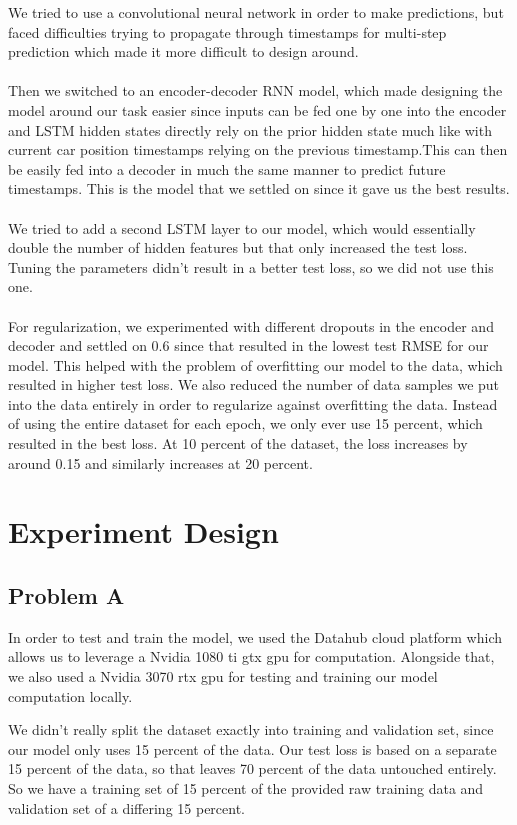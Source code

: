 \documentclass{article}
\begin{document}
We tried to use a convolutional neural network in order to make predictions, but faced difficulties trying to propagate through timestamps for multi-step prediction which made it more difficult to design around. \\ \\
Then we switched to an encoder-decoder RNN model, which made designing the model around our task easier since inputs can be fed one by one into the encoder and LSTM hidden states directly rely on the prior hidden state much like with current car position timestamps relying on the previous timestamp.This can then be easily fed into a decoder in much the same manner to predict future timestamps. This is the model that we settled on since it gave us the best results.\\ \\
We tried to add a second LSTM layer to our model, which would essentially double the number of hidden features but that only increased the test loss. Tuning the parameters didn't result in a better test loss, so we did not use this one. 
\\ \\ 
For regularization, we experimented with different dropouts in the encoder and decoder and settled on 0.6 since that resulted in the lowest test RMSE for our model. This helped with the problem of overfitting our model to the data, which resulted in higher test loss. We also reduced the number of data samples we put into the data entirely in order to regularize against overfitting the data. Instead of using the entire dataset for each epoch, we only ever use 15 percent, which resulted in the best loss. At 10 percent of the dataset, the loss increases by around 0.15 and similarly increases at 20 percent. 
\section{Experiment Design}
\subsection{Problem A}

In order to test and train the model, we used the Datahub cloud platform which allows us to leverage a Nvidia 1080 ti gtx gpu for computation. Alongside that, we also used a Nvidia 3070 rtx gpu for testing and training our model computation locally. 

We didn't really split the dataset exactly into training and validation set, since our model only uses 15 percent of the data. Our test loss is based on a separate 15 percent of the data, so that leaves 70 percent of the data untouched entirely. So we have a training set of 15 percent of the provided raw training data and validation set of a differing 15 percent. 
\end{document}
